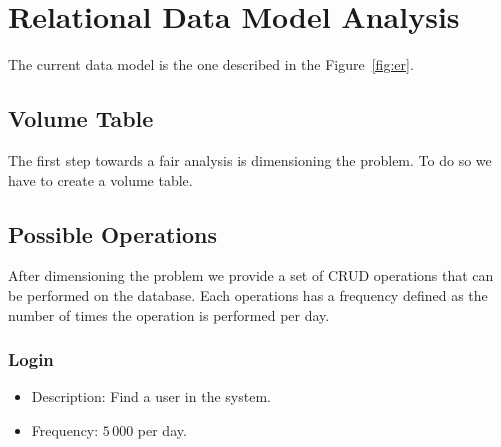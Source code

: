 \section{Relational Data Model Analysis}

The current data model is the one described in the Figure~\ref{fig:er}.

\subsection{Volume Table}

The first step towards a fair analysis is dimensioning the problem. To do so we
have to create a volume table.

\vspace{0.3cm}

\subsection{Possible Operations}

After dimensioning the problem we provide a set of CRUD operations that can be
performed on the database. Each operations has a frequency defined as the number
of times the operation is performed per day.

\subsubsection{Login}

\begin{itemize}
	\item Description: Find a user in the system.
	\item Frequency: \(5\,000\) per day.
\end{itemize}

